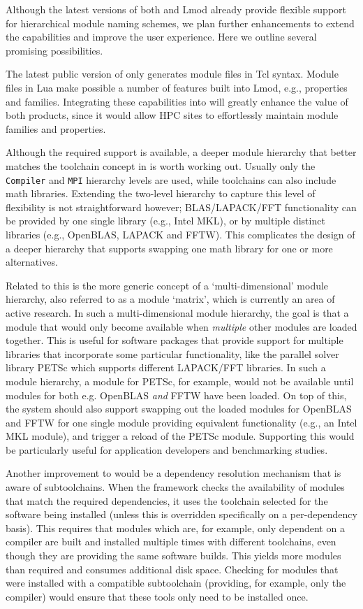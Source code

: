 Although the latest versions of both \easybuild{} and Lmod already provide
flexible support for hierarchical module naming schemes, we plan further enhancements
to extend the capabilities and improve the user experience. Here we outline several
promising possibilities.

The latest public version of \easybuild{} only generates module files in Tcl syntax.
Module files in Lua make possible a number of features built into Lmod, e.g.,
properties and families. Integrating these capabilities into \easybuild{} will
greatly enhance the value of both products, since it would allow HPC sites to
effortlessly maintain module families and properties.

Although the required support is available, a deeper module hierarchy that
better matches the toolchain concept in \easybuild{} is worth working out.
Usually only the \texttt{Compiler} and \texttt{MPI} hierarchy levels are used,
while \easybuild{} toolchains can also include math libraries. Extending
the two-level hierarchy to capture this level of flexibility is not straightforward
however; BLAS/LAPACK/FFT functionality can be provided by one single library (e.g.,
Intel MKL), or by multiple distinct libraries (e.g., OpenBLAS, LAPACK and FFTW).
This complicates the design of a deeper hierarchy that supports swapping one
math library for one or more alternatives.

Related to this is the more generic concept of a `multi-dimensional' module hierarchy,
also referred to as a module `matrix', which is currently an area of active research.
In such a multi-dimensional module hierarchy, the goal is that a module that would
only become available when \emph{multiple} other modules are loaded together. This is
useful for software packages that provide support for multiple libraries that
incorporate some particular functionality, like the parallel
solver library PETSc which supports different LAPACK/FFT libraries. In such a module
hierarchy, a module for PETSc, for example, would not be available until modules
for both e.g. OpenBLAS \emph{and} FFTW have been loaded. On top of this, the system
should also support swapping out the loaded modules for OpenBLAS and FFTW for one
single module providing equivalent functionality (e.g., an Intel MKL module), and
trigger a reload of the PETSc module. Supporting this would be particularly useful for
application developers and benchmarking studies.

Another improvement to \easybuild{} would be a dependency resolution
mechanism that is aware of subtoolchains. When the \easybuild{} framework checks the
availability of modules that match the required dependencies, it uses the toolchain
selected for the software being installed (unless this is overridden specifically on a
per-dependency basis). This requires that modules which are, for example, only
dependent on a compiler are built and installed multiple times with different
toolchains, even though they are providing the same software builds. This yields
more modules than required and consumes additional disk space. Checking for
modules that were installed with a compatible subtoolchain (providing, for example,
only the compiler) would ensure that these tools only need to be installed once.

